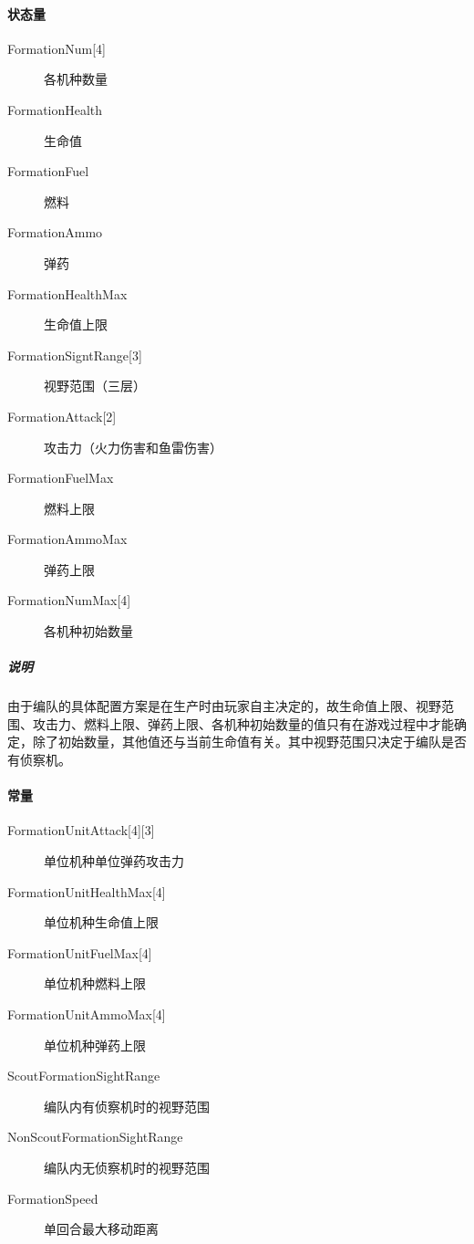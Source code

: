 \documentclass[11pt,a4paper]{article}
\begin{document}
      \paragraph{状态量}
        \begin{minipage}[t]{0.8\textwidth}
          \begin{description}
            \item[{FormationNum[4]}] 各机种数量
            \item[FormationHealth] 生命值
            \item[FormationFuel] 燃料
            \item[FormationAmmo] 弹药
            \item[FormationHealthMax] 生命值上限
            \item[{FormationSigntRange[3]}] 视野范围（三层）
            \item[{FormationAttack[2]}] 攻击力（火力伤害和鱼雷伤害）
            \item[FormationFuelMax] 燃料上限
            \item[FormationAmmoMax] 弹药上限
            \item[{FormationNumMax[4]}] 各机种初始数量
          \end{description}
        \end{minipage}
        \subparagraph{说明}
          由于编队的具体配置方案是在生产时由玩家自主决定的，故生命值上限、视野范围、攻击力、燃料上限、弹药上限、各机种初始数量的值只有在游戏过程中才能确定，除了初始数量，其他值还与当前生命值有关。其中视野范围只决定于编队是否有侦察机。

      \paragraph{常量}
        \begin{minipage}[t]{0.8\textwidth}
          \begin{description}
            \item[{FormationUnitAttack[4][3]}] 单位机种单位弹药攻击力
            \item[{FormationUnitHealthMax[4]}] 单位机种生命值上限
            \item[{FormationUnitFuelMax[4]}] 单位机种燃料上限
            \item[{FormationUnitAmmoMax[4]}] 单位机种弹药上限
            \item[ScoutFormationSightRange] 编队内有侦察机时的视野范围
            \item[NonScoutFormationSightRange] 编队内无侦察机时的视野范围
            \item[FormationSpeed] 单回合最大移动距离
          \end{description}
        \end{minipage}
\end{document}
